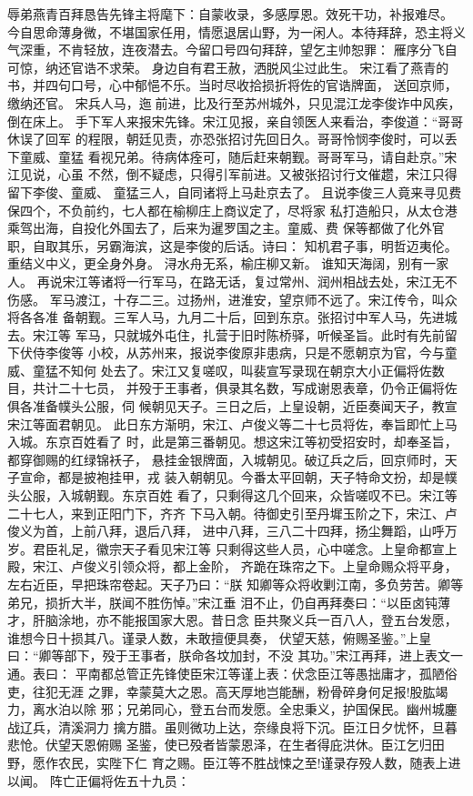 辱弟燕青百拜恳告先锋主将麾下：自蒙收录，多感厚恩。效死干功，补报难尽。
今自思命薄身微，不堪国家任用，情愿退居山野，为一闲人。本待拜辞，恐主将义
气深重，不肯轻放，连夜潜去。今留口号四句拜辞，望乞主帅恕罪：
雁序分飞自可惊，纳还官诰不求荣。
身边自有君王赦，洒脱风尘过此生。
宋江看了燕青的书，并四句口号，心中郁悒不乐。当时尽收拾损折将佐的官诰牌面，
送回京师，缴纳还官。
宋兵人马，迤前进，比及行至苏州城外，只见混江龙李俊诈中风疾，倒在床上。
手下军人来报宋先锋。宋江见报，亲自领医人来看治，李俊道：“哥哥休误了回军
的程限，朝廷见责，亦恐张招讨先回日久。哥哥怜悯李俊时，可以丢下童威、童猛
看视兄弟。待病体痊可，随后赶来朝觐。哥哥军马，请自赴京。”宋江见说，心虽
不然，倒不疑虑，只得引军前进。又被张招讨行文催趱，宋江只得留下李俊、童威、
童猛三人，自同诸将上马赴京去了。
且说李俊三人竟来寻见费保四个，不负前约，七人都在榆柳庄上商议定了，尽将家
私打造船只，从太仓港乘驾出海，自投化外国去了，后来为暹罗国之主。童威、费
保等都做了化外官职，自取其乐，另霸海滨，这是李俊的后话。诗曰：
知机君子事，明哲迈夷伦。
重结义中义，更全身外身。
浔水舟无系，榆庄柳又新。
谁知天海阔，别有一家人。
再说宋江等诸将一行军马，在路无话，复过常州、润州相战去处，宋江无不伤感。
军马渡江，十存二三。过扬州，进淮安，望京师不远了。宋江传令，叫众将各各准
备朝觐。三军人马，九月二十后，回到东京。张招讨中军人马，先进城去。宋江等
军马，只就城外屯住，扎营于旧时陈桥驿，听候圣旨。此时有先前留下伏侍李俊等
小校，从苏州来，报说李俊原非患病，只是不愿朝京为官，今与童威、童猛不知何
处去了。宋江又复嗟叹，叫裴宣写录现在朝京大小正偏将佐数目，共计二十七员，
并殁于王事者，俱录其名数，写成谢恩表章，仍令正偏将佐俱各准备幞头公服，伺
候朝见天子。三日之后，上皇设朝，近臣奏闻天子，教宣宋江等面君朝见。
此日东方渐明，宋江、卢俊义等二十七员将佐，奉旨即忙上马入城。东京百姓看了
时，此是第三番朝见。想这宋江等初受招安时，却奉圣旨，都穿御赐的红绿锦袄子，
悬挂金银牌面，入城朝见。破辽兵之后，回京师时，天子宣命，都是披袍挂甲，戎
装入朝朝见。今番太平回朝，天子特命文扮，却是幞头公服，入城朝觐。东京百姓
看了，只剩得这几个回来，众皆嗟叹不已。宋江等二十七人，来到正阳门下，齐齐
下马入朝。待御史引至丹墀玉阶之下，宋江、卢俊义为首，上前八拜，退后八拜，
进中八拜，三八二十四拜，扬尘舞蹈，山呼万岁。君臣礼足，徽宗天子看见宋江等
只剩得这些人员，心中嗟念。上皇命都宣上殿，宋江、卢俊义引领众将，都上金阶，
齐跪在珠帘之下。上皇命赐众将平身，左右近臣，早把珠帘卷起。天子乃曰：“朕
知卿等众将收剿江南，多负劳苦。卿等弟兄，损折大半，朕闻不胜伤悼。”宋江垂
泪不止，仍自再拜奏曰：“以臣卤钝薄才，肝脑涂地，亦不能报国家大恩。昔日念
臣共聚义兵一百八人，登五台发愿，谁想今日十损其八。谨录人数，未敢擅便具奏，
伏望天慈，俯赐圣鉴。”上皇曰：“卿等部下，殁于王事者，朕命各坟加封，不没
其功。”宋江再拜，进上表文一通。表曰：
平南都总管正先锋使臣宋江等谨上表：伏念臣江等愚拙庸才，孤陋俗吏，往犯无涯
之罪，幸蒙莫大之恩。高天厚地岂能酬，粉骨碎身何足报!股肱竭力，离水泊以除
邪；兄弟同心，登五台而发愿。全忠秉义，护国保民。幽州城鏖战辽兵，清溪洞力
擒方腊。虽则微功上达，奈缘良将下沉。臣江日夕忧怀，旦暮悲怆。伏望天恩俯赐
圣鉴，使已殁者皆蒙恩泽，在生者得庇洪休。臣江乞归田野，愿作农民，实陛下仁
育之赐。臣江等不胜战悚之至!谨录存殁人数，随表上进以闻。
阵亡正偏将佐五十九员：

